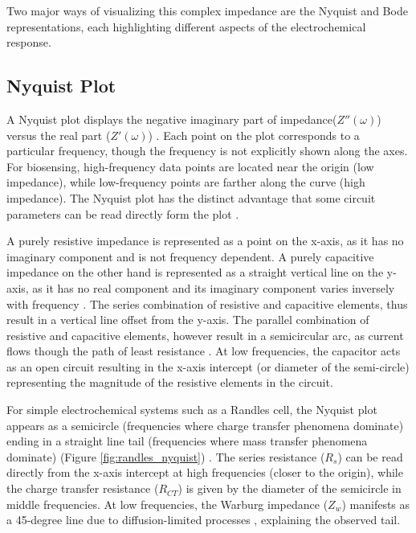 Two major ways of visualizing this complex impedance are the Nyquist and Bode representations, each highlighting different aspects of the electrochemical response.

\subsection{Nyquist Plot}
A Nyquist plot displays the negative imaginary part of impedance($Z''(\omega)$) versus the real part ($Z'(\omega)$) \cite{BodeNyquistPlot}. Each point on the plot corresponds to a particular frequency, though the frequency is not explicitly shown along the axes. For biosensing, high-frequency data points are located near the origin (low impedance), while low-frequency points are farther along the curve (high impedance). The Nyquist plot has the distinct advantage that some circuit parameters can be read directly form the plot \cite{BodeNyquistPlot}. 

A purely resistive impedance is represented as a point on the x-axis, as it has no imaginary component and is not frequency dependent. A purely capacitive impedance on the other hand is represented as a straight vertical line on the y-axis, as it has no real component and its imaginary component varies inversely with frequency \cite{BodeNyquistPlot}. The series combination of resistive and capacitive elements, thus result in a vertical line offset from the y-axis. The parallel combination of resistive and capacitive elements, however result in a semicircular arc, as current flows though the path of least resistance \cite{BodeNyquistPlot}. At low frequencies, the capacitor acts as an open circuit resulting in the x-axis intercept (or diameter of the semi-circle) representing the magnitude of the resistive elements in the circuit.

For simple electrochemical systems such as a Randles cell, the Nyquist plot appears as a semicircle (frequencies where charge transfer phenomena dominate) ending in a straight line tail (frequencies where mass transfer phenomena dominate) (Figure \ref{fig:randles_nyquist}) \cite{lazanasErratumElectrochemicalImpedance2025}. The series resistance ($R_s$) can be read directly from the x-axis intercept at high frequencies (closer to the origin), while the charge transfer resistance ($R_{CT}$) is given by the diameter of the semicircle in middle frequencies. At low frequencies, the Warburg impedance ($Z_w$) manifests as a 45-degree line due to diffusion-limited processes \cite{lazanasErratumElectrochemicalImpedance2025}, explaining the observed tail.

